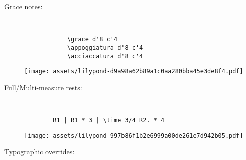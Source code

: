 \documentclass[a4paper]{tufte-handout}
\newenvironment{abjadbookoutput}{}{}
\begin{document}
\begin{description}
    \item[Grace notes:]
        \hfill \vspace{-\baselineskip} \\
        \begin{multicols}{2}

            \begin{verbatim}
            \grace d'8 c'4
            \appoggiatura d'8 c'4
            \acciaccatura d'8 c'4
            \end{verbatim}

            \begin{comment}
            <lilypond>
            {
                \grace d'8 c'4
                \appoggiatura d'8 c'4
                \acciaccatura d'8 c'4
            }
            </lilypond>
            \end{comment}

            \begin{abjadbookoutput}
            \noindent\texttt{[image: assets/lilypond-d9a98a62b89a1c0aa280bba45e3de8f4.pdf]}
            \end{abjadbookoutput}

        \end{multicols}

    \item[Full/Multi-measure rests:]
        \hfill \vspace{-0.5\baselineskip} \\

        \begin{verbatim}
        R1 | R1 * 3 | \time 3/4 R2. * 4
        \end{verbatim}

        \begin{comment}
        <lilypond>
        {
            R1 | R1 * 3 | \time 3/4 R2. * 4
        }
        </lilypond>
        \end{comment}

        \begin{abjadbookoutput}
        \noindent\texttt{[image: assets/lilypond-997b86f1b2e6999a00de261e7d942b05.pdf]}
        \end{abjadbookoutput}

    \item[Typographic overrides:]
        \hfill \vspace{-\baselineskip} \\
        \begin{multicols}{2}


\end{multicols}
\end{description}
\end{document}
